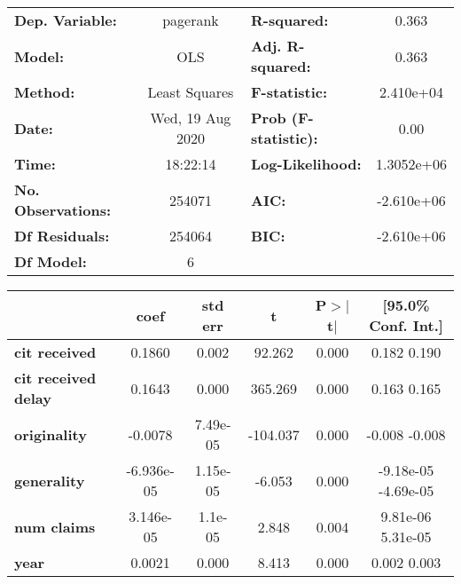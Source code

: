 \begin{center}
\begin{tabular}{lclc}
\toprule
\textbf{Dep. Variable:}     &     pagerank     & \textbf{  R-squared:         } &       0.363     \\
\textbf{Model:}             &       OLS        & \textbf{  Adj. R-squared:    } &       0.363     \\
\textbf{Method:}            &  Least Squares   & \textbf{  F-statistic:       } &   2.410e+04     \\
\textbf{Date:}              & Wed, 19 Aug 2020 & \textbf{  Prob (F-statistic):} &       0.00      \\
\textbf{Time:}              &     18:22:14     & \textbf{  Log-Likelihood:    } &   1.3052e+06    \\
\textbf{No. Observations:}  &      254071      & \textbf{  AIC:               } &   -2.610e+06    \\
\textbf{Df Residuals:}      &      254064      & \textbf{  BIC:               } &   -2.610e+06    \\
\textbf{Df Model:}          &           6      & \textbf{                     } &                 \\
\bottomrule
\end{tabular}
\begin{tabular}{lccccc}
                            & \textbf{coef} & \textbf{std err} & \textbf{t} & \textbf{P$>$$|$t$|$} & \textbf{[95.0\% Conf. Int.]}  \\
\midrule
\textbf{cit received}       &       0.1860  &        0.002     &    92.262  &         0.000        &         0.182     0.190       \\
\textbf{cit received delay} &       0.1643  &        0.000     &   365.269  &         0.000        &         0.163     0.165       \\
\textbf{originality}        &      -0.0078  &     7.49e-05     &  -104.037  &         0.000        &        -0.008    -0.008       \\
\textbf{generality}         &   -6.936e-05  &     1.15e-05     &    -6.053  &         0.000        &     -9.18e-05 -4.69e-05       \\
\textbf{num claims}         &    3.146e-05  &      1.1e-05     &     2.848  &         0.004        &      9.81e-06  5.31e-05       \\
\textbf{year}               &       0.0021  &        0.000     &     8.413  &         0.000        &         0.002     0.003       \\

\end{tabular}
\end{center}
